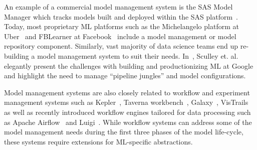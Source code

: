 \documentclass[11pt]{article}
\newcommand{\mdb}{{\sc ModelDB}\xspace}
\newcommand{\wf}{workflow\xspace}
\newcommand{\wfs}{workflows\xspace}
\newcommand{\mldevs}{ML developers\xspace}
\begin{document}
An example of a commercial model management system is the SAS Model Manager which tracks models built and deployed within the SAS platform~\cite{sas-model-manager}.
Today, most proprietary ML platforms such as the Michelangelo platform at Uber~\cite{michelangelo} and FBLearner at Facebook~\cite{fblearner} include a model management or model repository component.
Similarly, vast majority of data science teams end up re-building a model management system to suit their needs.
In~\cite{sculley2014high-interest-cc}, Sculley et. al. elegantly present the
challenges with building and productionizing ML at Google and highlight the need to manage ``pipeline jungles'' and model configurations.

Model management systems are also closely related to workflow and experiment management systems such as Kepler~\cite{kepler}, Taverna workbench~\cite{taverna},
Galaxy~\cite{galaxy}, VisTrails~\cite{bavoil2005vistrails, callahan2006vistrails, callahan2006workflows} as well as recently introduced workflow engines tailored for data processing such as Apache Airflow~\cite{airflow} and
Luigi~\cite{luigi}.
While workflow systems can address some of the model management needs during the first three phases of the model life-cycle, these systems require extensions for ML-specific abstractions.
\end{document}
